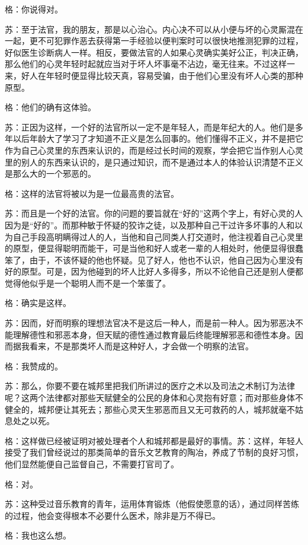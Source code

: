 \documentclass[11pt,oneside]{book}
\begin{document}
\begin{common-format}
格：你说得对。

苏：至于法官，我的朋友，那是以心治心。内心决不可以从小便与坏的心灵厮混在一起，更不可犯罪作恶去获得第一手经验以便判案时可以很快地推测犯罪的过程，好似医生诊断病人一样。相反，要做法官的人如果心灵确实美好公正，判决正确，那么他们的心灵年轻时起就应当对于坏人坏事毫不沾边，毫无往来。不过这样一来，好人在年轻时便显得比较天真，容易受骗，由于他们心里没有坏人心类的那种原型。

格：他们的确有这体验。

苏：正因为这样，一个好的法官所以一定不是年轻人，而是年纪大的人。他们是多年以后年龄大了学习了才知道不正义是怎么回事的。他们懂得不正义，并不是把它作为自己心灵里的东西来认识的，而是经过长时间的观察，学会把它当作别人心灵里的别人的东西来认识的，是只通过知识，而不是通过本人的体验认识清楚不正义是那么大的一个邪恶的。

格：这样的法官将被以为是一位最高贵的法官。

苏：而且是一个好的法官。你的问题的要旨就在“好的”这两个字上，有好心灵的人因为是“好的”。而那种敏于怀疑的狡诈之徒，以及那种自己干过许多坏事的人和以为自己手段高明瞒得过人的人，当他和自己同类人打交道时，他注视着自己心灵里的原型，便显得聪明而能干，可是当他和好人或老一辈的人相处时，他便显得很蠢笨了，由于，不该怀疑的他也怀疑。见了好人，他也不认识，他自己因为心里没有好的原型。可是，因为他碰到的坏人比好人多得多，所以不论他自己还是别人便都觉得他似乎是一个聪明人而不是一个笨蛋了。

格：确实是这样。

苏：因而，好而明察的理想法官决不是这后一种人，而是前一种人。因为邪恶决不能理解德性和邪恶本身，但天赋的德性通过教育最后终能理解邪恶和德性本身。因而据我看来，不是那类坏人而是这种好人，才会做一个明察的法官。

格：我赞成的。

苏：那么，你要不要在城邦里把我们所讲过的医疗之术以及司法之术制订为法律呢？这两个法律都对那些天赋健全的公民的身体和心灵抱有好意；而对那些身体不健全的，城邦便让其死去；那些心灵天生邪恶而且又无可救药的人，城邦就毫不姑息处之以死。

格：这样做已经被证明对被处理者个人和城邦都是最好的事情。苏：这样，年轻人接受了我们曾经说过的那类简单的音乐文艺教育的陶冶，养成了节制的良好习惯，他们显然能便自己监督自己，不需要打官司了。

格：对。

苏：这种受过音乐教育的青年，运用体育锻炼（他假使愿意的话），通过同样苦练的过程，他会变得根本不必要什么医术，除非是万不得已。

格：我也这么想。


\end{common-format}
\end{document}
